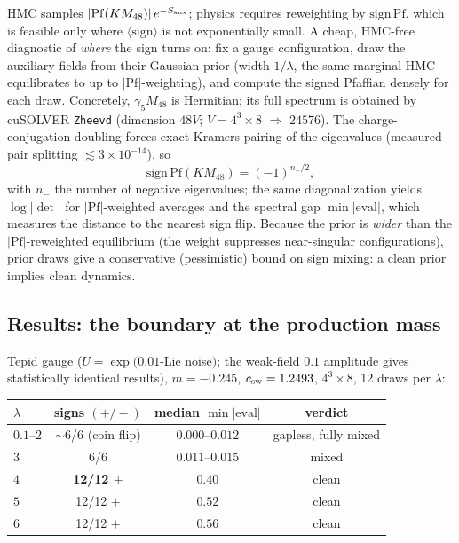 \documentclass[11pt]{article}
\begin{document}
HMC samples $|\mathrm{Pf}(K M_{48})|\,e^{-S_{\rm aux}}$; physics requires
reweighting by $\mathrm{sign}\,\mathrm{Pf}$, which is feasible only where
$\langle\mathrm{sign}\rangle$ is not exponentially small.  A cheap,
HMC-free diagnostic of \emph{where} the sign turns on: fix a gauge
configuration, draw the auxiliary fields from their Gaussian prior (width
$1/\lambda$, the same marginal HMC equilibrates to up to
$|\mathrm{Pf}|$-weighting), and compute the signed Pfaffian densely for
each draw.  Concretely, $\gamma_{5}M_{48}$ is Hermitian; its full spectrum
is obtained by cuSOLVER \texttt{Zheevd} (dimension $48V$; $V=4^{3}\times8$
$\Rightarrow$ $24576$).  The charge-conjugation doubling forces exact
Kramers pairing of the eigenvalues (measured pair splitting
$\lesssim3\times10^{-14}$), so
\begin{equation}
\mathrm{sign}\,\mathrm{Pf}(KM_{48})=(-1)^{n_{-}/2},
\end{equation}
with $n_{-}$ the number of negative eigenvalues; the same diagonalization
yields $\log|\det|$ for $|\mathrm{Pf}|$-weighted averages and the spectral
gap $\min|\mathrm{eval}|$, which measures the distance to the nearest sign
flip.  Because the prior is \emph{wider} than the
$|\mathrm{Pf}|$-reweighted equilibrium (the weight suppresses
near-singular configurations), prior draws give a conservative
(pessimistic) bound on sign mixing: a clean prior implies clean dynamics.

\subsection{Results: the boundary at the production mass}

Tepid gauge ($U=\exp(0.01$-Lie noise$)$; the weak-field $0.1$ amplitude
gives statistically identical results), $m=-0.245$,
$c_{\rm sw}=1.2493$, $4^{3}\times8$, 12 draws per $\lambda$:

\begin{center}
\begin{tabular}{lccc}
\toprule
$\lambda$ & signs $(+/-)$ & median $\min|\mathrm{eval}|$ & verdict\\
\midrule
$0.1$--$2$ & $\sim$6/6 (coin flip) & $0.000$--$0.012$ & gapless, fully mixed\\
$3$   & 6/6            & $0.011$--$0.015$ & mixed\\
$4$   & \textbf{12/12 $+$} & $0.40$ & clean\\
$5$   & 12/12 $+$      & $0.52$ & clean\\
$6$   & 12/12 $+$      & $0.56$ & clean\\
\bottomrule
\end{tabular}
\end{center}
\end{document}
